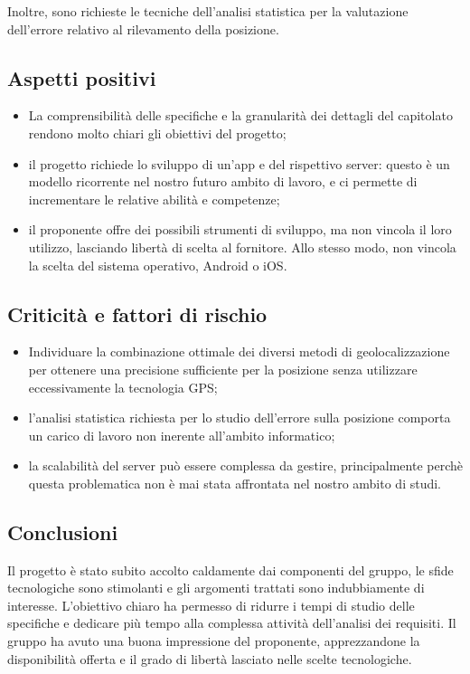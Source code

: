 \documentclass[../studio-di-fattibilita.tex]{subfiles}
\begin{document}
  Inoltre, sono richieste le tecniche dell'analisi statistica per la valutazione dell'errore relativo al rilevamento della posizione.


  \subsection{Aspetti positivi}%
  \label{subsec:aspetti_positivi}
  \begin{itemize}
    \item La comprensibilità delle specifiche e la granularità dei dettagli del capitolato rendono molto chiari gli obiettivi del progetto;
    \item il progetto richiede lo sviluppo di un'app e del rispettivo server: questo è un modello ricorrente nel nostro futuro ambito di lavoro, e ci permette di incrementare le relative abilità e competenze;
    \item il proponente offre dei possibili strumenti di sviluppo, ma non vincola il loro utilizzo, lasciando libertà di scelta al fornitore. Allo stesso modo, non vincola la scelta del sistema operativo, Android o iOS.
  \end{itemize}


  \subsection{Criticità e fattori di rischio}%
  \label{subsec:criticita_e_fattori_di_rischio}
  \begin{itemize}
    \item Individuare la combinazione ottimale dei diversi metodi di geolocalizzazione per ottenere una precisione sufficiente per la posizione senza utilizzare eccessivamente la tecnologia GPS;
    \item l'analisi statistica richiesta per lo studio dell'errore sulla posizione comporta un carico di lavoro non inerente all'ambito informatico;
    \item la scalabilità del server può essere complessa da gestire, principalmente perchè questa problematica non è mai stata affrontata nel nostro ambito di studi.
  \end{itemize}


  \subsection{Conclusioni}%
  \label{subsec:conclusioni}
  Il progetto è stato subito accolto caldamente dai componenti del gruppo, le sfide tecnologiche sono stimolanti e gli argomenti trattati sono indubbiamente di interesse. L'obiettivo chiaro ha permesso di ridurre i tempi di studio delle specifiche e dedicare più tempo alla complessa attività dell'analisi dei requisiti. Il gruppo ha avuto una buona impressione del proponente, apprezzandone la disponibilità offerta e il grado di libertà lasciato nelle scelte tecnologiche.
\end{document}
